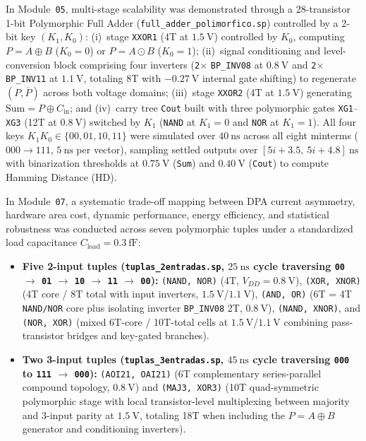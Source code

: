 In Module~\texttt{05}, multi-stage scalability was demonstrated through a 28-transistor 1-bit Polymorphic Full Adder (\texttt{full\_adder\_polimorfico.sp}) controlled by a 2-bit key $(K_1, K_0)$: (i)~stage \texttt{XXOR1} (4T at $1.5\ \text{V}$) controlled by $K_0$, computing $P = A \oplus B$ ($K_0=0$) or $P = A \odot B$ ($K_0=1$); (ii)~signal conditioning and level-conversion block comprising four inverters (\texttt{2}$\times$ \texttt{BP\_INV08} at $0.8\ \text{V}$ and \texttt{2}$\times$ \texttt{BP\_INV11} at $1.1\ \text{V}$, totaling 8T with $-0.27\ \text{V}$ internal gate shifting) to regenerate $(P, \overline{P})$ across both voltage domains; (iii)~stage \texttt{XXOR2} (4T at $1.5\ \text{V}$) generating $\mathrm{Sum} = P \oplus C_{\mathrm{in}}$; and (iv)~carry tree \texttt{Cout} built with three polymorphic gates \texttt{XG1}--\texttt{XG3} (12T at $0.8\ \text{V}$) switched by $K_1$ (\texttt{NAND} at $K_1=0$ and \texttt{NOR} at $K_1=1$). All four keys $K_1 K_0 \in \{00, 01, 10, 11\}$ were simulated over $40\ \text{ns}$ across all eight minterms ($000 \to 111$, $5\ \text{ns}$ per vector), sampling settled outputs over $[5i+3.5,\ 5i+4.8]\ \text{ns}$ with binarization thresholds at $0.75\ \text{V}$ (\texttt{Sum}) and $0.40\ \text{V}$ (\texttt{Cout}) to compute Hamming Distance (HD).

In Module~\texttt{07}, a systematic trade-off mapping between DPA current asymmetry, hardware area cost, dynamic performance, energy efficiency, and statistical robustness was conducted across seven polymorphic tuples under a standardized load capacitance $C_{\mathrm{load}} = 0.3\ \text{fF}$:
\begin{itemize}
    \item \textbf{Five 2-input tuples (\texttt{tuplas\_\allowbreak 2entradas.sp}, $25\ \text{ns}$ cycle traversing \texttt{00} $\to$ \texttt{01} $\to$ \texttt{10} $\to$ \texttt{11} $\to$ \texttt{00}):} \texttt{(NAND, NOR)} (4T, $V_{DD}=0.8\ \text{V}$), \texttt{(XOR, XNOR)} (4T core / 8T total with input inverters, $1.5\ \text{V}$/$1.1\ \text{V}$), \texttt{(AND, OR)} (6T = 4T \texttt{NAND/NOR} core plus isolating inverter \texttt{BP\_INV08} 2T, $0.8\ \text{V}$), \texttt{(NAND, XNOR)}, and \texttt{(NOR, XOR)} (mixed 6T-core / 10T-total cells at $1.5\ \text{V}$/$1.1\ \text{V}$ combining pass-transistor bridges and key-gated branches).
    \item \textbf{Two 3-input tuples (\texttt{tuplas\_\allowbreak 3entradas.sp}, $45\ \text{ns}$ cycle traversing \texttt{000} to \texttt{111} $\to$ \texttt{000}):} \texttt{(AOI21, OAI21)} (6T complementary series-parallel compound topology, $0.8\ \text{V}$) and \texttt{(MAJ3, XOR3)} (10T quad-symmetric polymorphic stage with local transistor-level multiplexing between majority and 3-input parity at $1.5\ \text{V}$, totaling 18T when including the $P = A \oplus B$ generator and conditioning inverters).
\end{itemize}

